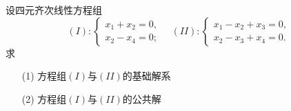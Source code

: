\begin{frame}
  \begin{li}
    设四元齐次线性方程组
    $$
    (I):\left\{
      \begin{array}{l}
        x_1+x_2=0,\\
        x_2-x_4=0;
      \end{array}
    \right. \quad
    (II):\left\{
      \begin{array}{l}
        x_1-x_2+x_3=0,\\
        x_2-x_3+x_4=0.
      \end{array}
    \right.
    $$
    求
    \begin{itemize}
    \item[(1)] 方程组$(I)$与$(II)$的基础解系
    \item[(2)] 方程组$(I)$与$(II)$的公共解        
    \end{itemize}
  \end{li}
\end{frame}

